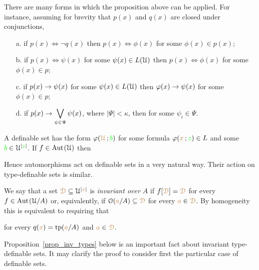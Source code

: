 \documentclass[creche.tex]{subfiles}
\begin{document}
\begin{remark}\label{rem_normality}There are many forms in which the proposition above can be applied. For instance, assuming for brevity that $p(x)$ and $q(x)$ are closed under conjunctions,
\begin{itemize}
\item[a.] if $p(x)\iff\neg q(x)$ then $p(x)\iff\phi(x)$ for some $\phi(x)\in p(x)$;\smallskip
\item[b.] if $\displaystyle p(x)\iff\psi(x)$ for some $\psi(x)\in L(\EuScript U)$ then $p(x)\iff\phi(x)$ for some $\phi(x)\in p$;\smallskip
\item[c.] if $\displaystyle p(x)\rightarrow\psi(x)$ for some $\psi(x)\in L(\EuScript U)$ then $\varphi(x)\rightarrow\psi(x)$ for some $\phi(x)\in p$;\smallskip
\item[d.] if $\displaystyle p(x)\rightarrow\bigvee_{\psi\in\Psi}\psi(x)$, where $|\Psi|<\kappa$,  then  for some $\psi_i\in\Psi$.\QED
\end{itemize}
\end{remark}

\begin{remark}A definable set has the form $\varphi({\color{brown}\EuScript U}\,;{\color{green} b})$ for some formula $\varphi({\color{brown} x}\,;{\color{green} z})\in L$ and some ${\color{green} b}\in\EuScript U^{|{\color{green} z}|}$.
If $f\in{\rm Aut\kern.15ex}(\EuScript U)$ then 




Hence automorphisms act on definable sets in a very natural way. 
Their action on type-definable sets is similar.\QED
\end{remark}

We say that a set ${\color{brown}\EuScript D}\subseteq\EuScript U^{|{\color{brown} x}|}$ is \emph{invariant over $A$\/} if $f[{\color{brown}\EuScript D}]={\color{brown}\EuScript D}$ for every $f\in{\rm Aut\kern.15ex}(\EuScript U/A)$ or, equivalently, if $\EuScript O({\color{brown} a}/A)\subseteq {\color{brown}\EuScript D}$ for every ${\color{brown} a}\in {\color{brown}\EuScript D}$.
By homogeneity this is equivalent to requiring that 


for every $q({\color{brown} x})={\rm tp}({\color{brown} a}/A)$ and ${\color{brown} a}\in {\color{brown}\EuScript D}$.

Proposition~\ref{prop_inv_types} below is an important fact about invariant type-definable sets. It may clarify the proof to consider first the particular case of definable sets.
\end{document}
